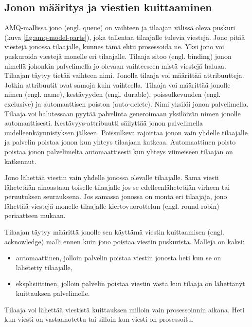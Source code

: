 \subsection{Jonon määritys ja viestien kuittaaminen}
AMQ-mallissa jono (engl. queue) on vaihteen ja tilaajan välissä oleva puskuri (kuva \ref{fig:amq-model-parts}), joka tallentaa tilaajalle tulevia viestejä. Jono pitää viestejä jonossa tilaajalle, kunnes tämä ehtii prosessoida ne. Yksi jono voi puskuroida viestejä monelle eri tilaajalle. Tilaaja sitoo (engl. binding) jonon nimellä johonkin palvelimella jo olevaan vaihteeseen mistä viestejä haluaa. Tilaajan täytyy tietää vaihteen nimi. Jonolla tilaaja voi määrittää attribuutteja. Jotkin attribuutit ovat samoja kuin vaihteella. Tilaaja voi määrittää jonolle nimen (engl. name), kestävyyden (engl. durable), poissulkevuuden (engl. exclusive) ja automaattisen poiston (auto-delete). Nimi yksilöi jonon palvelimella. Tilaaja voi halutessaan pyytää palvelinta generoimaan yksilöivän nimen jonolle automaattisesti. Kestävyys-attribuutti säilyttää jonon palvelimella uudelleenkäynnistyksen jälkeen. Poissulkeva rajoittaa jonon vain yhdelle tilaajalle ja palvelin poistaa jonon kun yhteys tilaajaan katkeaa. Automaattinen poisto poistaa jonon palvelimelta automaattisesti kun yhteys viimeiseen tilaajan on katkennut. \cite{RabbitMQ-AMQP-0-9-1-Model-Explained}

Jono lähettää viestin vain yhdelle jonossa olevalle tilaajalle. Sama viesti lähetetään ainoastaan toiselle tilaajalle jos se edelleenlähetetään virheen tai peruutuksen seurauksena. Jos samassa jonossa on monta eri tilaajaja, jono lähettää viestejä monelle tilaajalle kiertovuorottelun (engl. round-robin) periaatteen mukaan. \cite[s.~11--12]{AMQP-specification}

Tilaajan täytyy määrittä jonolle sen käyttämä viestin kuittaamisen (engl. acknowledge) malli ennen kuin jono poistaa viestin puskurista. Malleja on kaksi:
\begin{itemize}
	\item automaattinen, jolloin palvelin poistaa viestin jonosta heti kun se on lähetetty tilaajalle,
	\item eksplisiittinen, jolloin palvelin poistaa viestin vasta kun tilaaja on lähettänyt kuittauksen palvelimelle.
\end{itemize}
Tilaaja voi lähettää viestistä kuittauksen milloin vain prosessoinnin aikana. Heti kun viesti on vastaanotettu tai silloin kun viesti on prosessoitu. \cite[s.~29]{AMQP-specification}